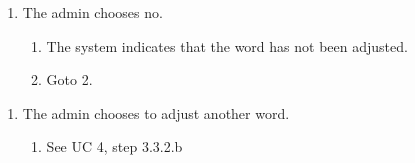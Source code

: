 \documentclass[12pt, letterpaper]{article}
\begin{document}
\begin{enumerate}[label=6.1.]
	\item The admin chooses no. 
	\begin{enumerate}[label=6.1.\arabic*]
		\item The system indicates that the word has not been adjusted.
		\item Goto 2.
	\end{enumerate}
\end{enumerate}
\begin{enumerate}[label=10.1.]
	\item The admin chooses to adjust another word. 
	\begin{enumerate}[label=10.1.\arabic*]
		\item See UC 4, step 3.3.2.b
	\end{enumerate}
\end{enumerate}
\end{document}
